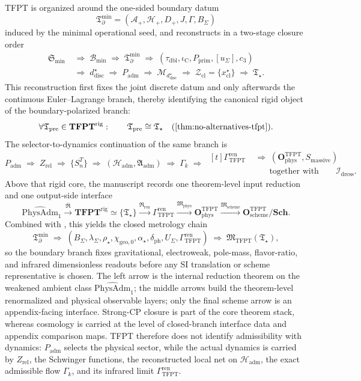 \documentclass[11pt,a4paper]{article}
\theoremstyle{definition}
\theoremstyle{remark}
\newcommand{\taudbl}{\tau_{\mathrm{dbl}}}
\newcommand{\iC}{\iota_{\mathrm C}}
\newcommand{\cthree}{c_3}
\newcommand{\Tbound}{\mathfrak T_{\partial}^{\min}}
\newcommand{\chigeozero}{\chi_{\mathrm{geo},0}}
\newcommand{\Padm}{P_{\mathrm{adm}}}
\newcommand{\Pprim}{P_{\mathrm{prim}}}
\newcommand{\Tpre}{\mathfrak T_{\mathrm{pre}}}
\newcommand{\Tstar}{\mathfrak T_{\star}}
\newcommand{\PhysAdmOne}{\widehat{\mathrm{PhysAdm}}_1}
\newcommand{\GrenTFPT}{\Gamma_{\mathrm{TFPT}}^{\mathrm{ren}}}
\newcommand{\OphysTFPT}{\mathbf O_{\mathrm{phys}}^{\mathrm{TFPT}}}
\newcommand{\OschemeTFPT}{\mathbf O_{\mathrm{scheme}}^{\mathrm{TFPT}}}
\newcommand{\SchGrp}{\mathbf{Sch}}
\newcommand{\Runiv}{\mathfrak R}
\newcommand{\Mphys}{\mathfrak M_{\mathrm{phys}}}
\newcommand{\Mscheme}{\mathfrak M_{\mathrm{scheme}}}
\newcommand{\Rren}{\mathfrak R_{\mathrm{ren}}}
\newcommand{\Runivrig}{\overline{\Runiv}}
\begin{document}
TFPT is organized around the one-sided boundary datum
\[
\Tbound=(\mathcal A_+,\mathcal H_+,D_+,J,\Gamma,B_\Sigma)
\]
induced by the minimal operational seed, and reconstructs in a two-stage closure order
\[
\begin{aligned}
\mathfrak S_{\min}
&\;\Rightarrow\;
\mathcal B_{\min}
\;\Rightarrow\;
\Tbound
\;\Rightarrow\;
(\taudbl,\iC,\Pprim,[u_\Sigma],\cthree)\\
&\;\Rightarrow\;
d^\star_{\mathrm{disc}}
\;\Rightarrow\;
\Padm
\;\Rightarrow\;
\mathcal M_{d^\star_{\mathrm{disc}}}
\;\Rightarrow\;
\mathcal Z_{\mathrm{cl}}=\{x^\star_{\mathrm{cl}}\}
\;\Rightarrow\;
\Tstar.
\end{aligned}
\]
This reconstruction first fixes the joint discrete datum and only afterwards the continuous
Euler--Lagrange branch, thereby identifying the canonical rigid object of the boundary-polarized
branch:
\[
\forall \Tpre\in\mathbf{TFPT}^{\mathrm{rig}}:\qquad
\Tpre\cong \Tstar
\quad\text{(\Cref{thm:no-alternatives-tfpt})}.
\]
The selector-to-dynamics continuation of the same branch is
\[
\Padm
\;\Rightarrow\;
Z_{\mathrm{rel}}
\;\Rightarrow\;
\{S_n^T\}
\;\Rightarrow\;
(\mathcal H_{\mathrm{adm}},\mathfrak A_{\mathrm{adm}})
\;\Rightarrow\;
\Gamma_k
\;\Rightarrow\;
\begin{aligned}[t]
\Gamma_{\mathrm{TFPT}}^{\mathrm{ren}}
&\;\Rightarrow\;
(\OphysTFPT,S_{\mathrm{massive}})\\
&\qquad\text{together with}\qquad
\mathcal I_{\mathrm{dress}}.
\end{aligned}
\]
Above that rigid core, the manuscript records one theorem-level input reduction and one output-side
interface
\[
\PhysAdmOne
\xrightarrow{\Runivrig}
\mathbf{TFPT}^{\mathrm{rig}}
\simeq
\{\Tstar\}
\xrightarrow{\Rren}
\GrenTFPT
\xrightarrow{\Mphys}
\OphysTFPT
\xrightarrow{\Mscheme}
\OschemeTFPT/\SchGrp.
\]
Combined with , this yields the closed metrology chain
\[
\Tbound
\;\Rightarrow\;
(B_\Sigma,\lambda_\Sigma,\rho_\star,\chigeozero,\alpha_\star,\delta_{\mathrm{ph}},U_\Sigma,\Gamma_{\mathrm{TFPT}}^{\mathrm{ren}})
\;\Rightarrow\;
\mathfrak M_{\mathrm{TFPT}}(\Tstar),
\]
so the boundary branch fixes gravitational, electroweak, pole-mass, flavor-ratio, and infrared
dimensionless readouts before any SI translation or scheme representative is chosen.
The left arrow is the internal reduction theorem on the weakened ambient class $\PhysAdmOne$; the
middle arrows build the theorem-level renormalized and physical observable layers; only the final
scheme arrow is an appendix-facing interface. Strong-CP closure is part of the core theorem stack,
whereas cosmology is carried at the level of closed-branch interface data and appendix comparison
maps. TFPT therefore does not identify
admissibility with dynamics: $\Padm$ selects the physical sector, while the actual dynamics is
carried by $Z_{\mathrm{rel}}$, the Schwinger functions, the reconstructed local net on
$\mathcal H_{\mathrm{adm}}$, the exact admissible flow $\Gamma_k$, and its infrared limit
$\Gamma_{\mathrm{TFPT}}^{\mathrm{ren}}$.
\end{document}

